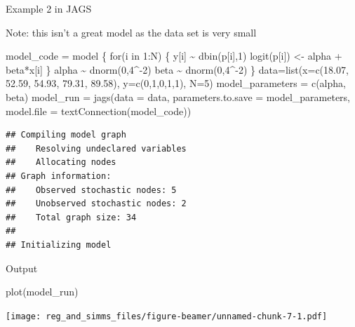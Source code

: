 \documentclass[
  ignorenonframetext,
  aspectratio=169]{beamer}
\newenvironment{Shaded}{\begin{snugshade}}{\end{snugshade}}
\newcommand{\AttributeTok}[1]{\textcolor[rgb]{0.77,0.63,0.00}{#1}}
\newcommand{\DecValTok}[1]{\textcolor[rgb]{0.00,0.00,0.81}{#1}}
\newcommand{\FloatTok}[1]{\textcolor[rgb]{0.00,0.00,0.81}{#1}}
\newcommand{\FunctionTok}[1]{\textcolor[rgb]{0.00,0.00,0.00}{#1}}
\newcommand{\NormalTok}[1]{#1}
\newcommand{\OtherTok}[1]{\textcolor[rgb]{0.56,0.35,0.01}{#1}}
\newcommand{\StringTok}[1]{\textcolor[rgb]{0.31,0.60,0.02}{#1}}
\begin{document}
\begin{frame}[fragile]{Example 2 in JAGS}
\protect\hypertarget{example-2-in-jags}{}
\small

Note: this isn't a great model as the data set is very small

\begin{Shaded}
\begin{Highlighting}[]
\NormalTok{model\_code }\OtherTok{=}\StringTok{\textquotesingle{}}
\StringTok{model \{}
\StringTok{  for(i in 1:N) \{ }
\StringTok{    y[i] \textasciitilde{} dbin(p[i],1) }
\StringTok{    logit(p[i]) \textless{}{-} alpha + beta*x[i]}
\StringTok{  \}}
\StringTok{  alpha \textasciitilde{} dnorm(0,4\^{}{-}2)}
\StringTok{  beta \textasciitilde{} dnorm(0,4\^{}{-}2)}
\StringTok{\}}
\StringTok{\textquotesingle{}}
\NormalTok{data}\OtherTok{=}\FunctionTok{list}\NormalTok{(}\AttributeTok{x=}\FunctionTok{c}\NormalTok{(}\FloatTok{18.07}\NormalTok{, }\FloatTok{52.59}\NormalTok{, }\FloatTok{54.93}\NormalTok{, }\FloatTok{79.31}\NormalTok{, }\FloatTok{89.58}\NormalTok{),}
          \AttributeTok{y=}\FunctionTok{c}\NormalTok{(}\DecValTok{0}\NormalTok{,}\DecValTok{1}\NormalTok{,}\DecValTok{0}\NormalTok{,}\DecValTok{1}\NormalTok{,}\DecValTok{1}\NormalTok{),}
          \AttributeTok{N=}\DecValTok{5}\NormalTok{)}
\NormalTok{model\_parameters }\OtherTok{=} \FunctionTok{c}\NormalTok{(}\StringTok{\textquotesingle{}alpha\textquotesingle{}}\NormalTok{, }\StringTok{\textquotesingle{}beta\textquotesingle{}}\NormalTok{)}
\NormalTok{model\_run }\OtherTok{=} \FunctionTok{jags}\NormalTok{(}\AttributeTok{data =}\NormalTok{ data,}
                 \AttributeTok{parameters.to.save =}\NormalTok{ model\_parameters,}
                 \AttributeTok{model.file =} \FunctionTok{textConnection}\NormalTok{(model\_code))}
\end{Highlighting}
\end{Shaded}

\begin{verbatim}
## Compiling model graph
##    Resolving undeclared variables
##    Allocating nodes
## Graph information:
##    Observed stochastic nodes: 5
##    Unobserved stochastic nodes: 2
##    Total graph size: 34
## 
## Initializing model
\end{verbatim}
\end{frame}

\begin{frame}[fragile]{Output}
\protect\hypertarget{output}{}
\begin{Shaded}
\begin{Highlighting}[]
\FunctionTok{plot}\NormalTok{(model\_run)}
\end{Highlighting}
\end{Shaded}

\texttt{[image: reg\_and\_simms\_files/figure-beamer/unnamed-chunk-7-1.pdf]}
\end{frame}
\end{document}
